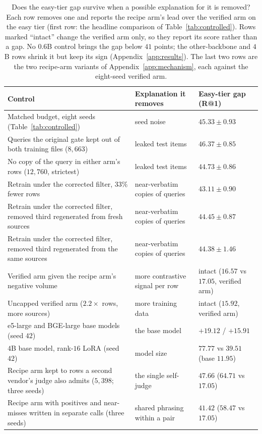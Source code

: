 \begin{table}[htbp]
\centering
\caption{Does the easy-tier gap survive when a possible explanation for it is removed? Each row removes one and reports the recipe arm's lead over the verified arm on the easy tier (first row: the headline comparison of Table~\ref{tab:controlled}). Rows marked ``intact'' change the verified arm only, so they report its score rather than a gap. No $0.6$B control brings the gap below $41$ points; the other-backbone and $4$B rows shrink it but keep its sign (Appendix~\ref{app:results}). The last two rows are the two recipe-arm variants of Appendix~\ref{app:mechanism}, each against the eight-seed verified arm.}
\label{tab:ablations}
\footnotesize
\setlength{\tabcolsep}{4pt}
\begin{tabular}{@{}p{7.3cm}p{3.1cm}>{\centering\arraybackslash}p{3.0cm}@{}}
\toprule
Control & Explanation it removes & Easy-tier gap (R@1) \\
\midrule
Matched budget, eight seeds (Table~\ref{tab:controlled}) & seed noise & $45.33 \pm 0.93$ \\
Queries the original gate kept out of both training files ($8{,}663$) & leaked test items & $46.37 \pm 0.85$ \\
No copy of the query in either arm's rows ($12{,}760$, strictest) & leaked test items & $44.73 \pm 0.86$ \\
Retrain under the corrected filter, $33\%$ fewer rows & near-verbatim copies of queries & $43.11 \pm 0.90$ \\
Retrain under the corrected filter, removed third regenerated from fresh sources & near-verbatim copies of queries & $44.45 \pm 0.87$ \\
Retrain under the corrected filter, removed third regenerated from the same sources & near-verbatim copies of queries & $44.38 \pm 1.46$ \\
Verified arm given the recipe arm's negative volume & more contrastive signal per row & intact ($16.57$ vs $17.05$, verified arm) \\
Uncapped verified arm ($2.2\times$ rows, more sources) & more training data & intact ($15.92$, verified arm) \\
e5-large and BGE-large base models (seed $42$) & the base model & $+19.12$ / $+15.91$ \\
$4$B base model, rank-$16$ LoRA (seed $42$) & model size & $77.77$ vs $39.51$ (base $11.95$) \\
Recipe arm kept to rows a second vendor's judge also admits ($5{,}398$; three seeds) & the single self-judge & $47.66$ ($64.71$ vs $17.05$) \\
Recipe arm with positives and near-misses written in separate calls (three seeds) & shared phrasing within a pair & $41.42$ ($58.47$ vs $17.05$) \\
\bottomrule
\end{tabular}
\end{table}


